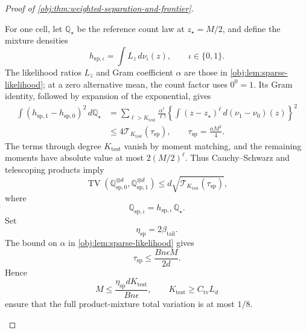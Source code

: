 \begin{proof}[Proof of \cref{obj:thm:weighted-separation-and-frontier}]
\begin{enumerate}
For one cell, let \(\mathbb Q_\star\) be the reference count law at \(z_\star=M/2\), and define the mixture densities
\[
h_{\mathrm{sp},\iota}
=\int L_z\,d\nu_\iota(z),
\qquad \iota\in\{0,1\}.
\]
The likelihood ratios \(L_z\) and Gram coefficient \(\alpha\) are those in
\cref{obj:lem:sparse-likelihood}; at a zero alternative mean, the count factor uses \(0^0=1\). Its Gram identity, followed by expansion of the exponential, gives
\[
\begin{aligned}
\int(h_{\mathrm{sp},1}-h_{\mathrm{sp},0})^2\,d\mathbb Q_\star
&=
\sum_{\ell>K_{\mathrm{test}}}\frac{\alpha^\ell}{\ell!}
\left\{
\int(z-z_\star)^\ell\,d(\nu_1-\nu_0)(z)
\right\}^2\\
&\le
4\mathcal T_{K_{\mathrm{test}}}(\tau_{\mathrm{sp}}),
\qquad
\tau_{\mathrm{sp}}=\frac{\alpha M^2}{4}.
\end{aligned}
\]
The terms through degree \(K_{\mathrm{test}}\) vanish by moment matching, and the remaining moments have absolute value at most
\(2(M/2)^\ell\). Thus Cauchy--Schwarz and telescoping products imply
\[
\operatorname{TV}
\left(\mathbb Q_{\mathrm{sp},0}^{\otimes d},
      \mathbb Q_{\mathrm{sp},1}^{\otimes d}\right)
\le
d\sqrt{\mathcal T_{K_{\mathrm{test}}}(\tau_{\mathrm{sp}})},
\]
where
\[
\mathbb Q_{\mathrm{sp},\iota}
=h_{\mathrm{sp},\iota}\,\mathbb Q_\star.
\]
Set
\[
\eta_{\mathrm{sp}}=2\beta_{\mathrm{tail}}.
\]
The bound on \(\alpha\) in
\cref{obj:lem:sparse-likelihood} gives
\[
\tau_{\mathrm{sp}}\le\frac{Bn\epsilon M}{2d}.
\]
Hence
\[
M\le\frac{\eta_{\mathrm{sp}}dK_{\mathrm{test}}}{Bn\epsilon},
\qquad
K_{\mathrm{test}}\ge C_{\mathrm{tv}}L_d
\]
ensure that the full product-mixture total variation is at most \(1/8\).


\end{enumerate}
\end{proof}
